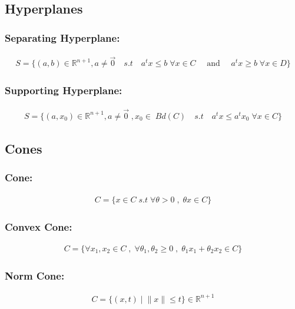 \documentclass[a4paper,10pt]{report}
\begin{document}
\subsection{Hyperplanes}

\subsubsection{Separating Hyperplane:}
\begin{align}
  S = \{ (a,b) \in \mathbb{R}^{n+1}, a \neq \vec{0} \quad s.t \quad a^t x \leq b \; \forall x \in C \quad \text{ and } \quad a^t x \geq b \; \forall x \in D  \}
\end{align}

\subsubsection{Supporting Hyperplane:}
\begin{align}
  S = \{ (a,x_0) \in \mathbb{R}^{n+1}, a \neq \vec{0} \; , x_0 \in \; Bd(C)  \quad s.t \quad a^t x \leq a^t x_0 \; \forall x \in C \}
\end{align}

\subsection{Cones}

\subsubsection{Cone:}
  \begin{align}
    C = \{ x \in C \; s.t \; \forall \theta > 0 \; , \; \theta x \in C  \} 
  \end{align}

  \subsubsection{Convex Cone:}
  
  \begin{align}
    C = \{ \forall x_1, x_2 \in C \; , \;  \forall \theta_1, \theta_2 \geq 0 \; , \;  \theta_1 x_1 + \theta_2 x_2 \in C \}
  \end{align}

  \subsubsection{Norm Cone:}
  
  \begin{align}
    C = \{(x, t) \; | \;  \|x\| \leq t\} \in \mathbb{R}^{n+1}
  \end{align}
  
\end{document}
